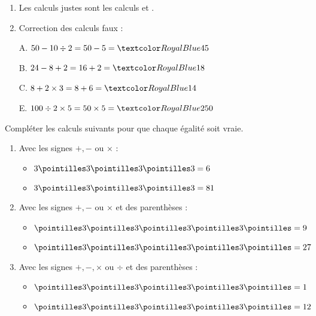 \begin{Maquette}[Fiche,CorrigeFin,Colonnes=2]{}
\begin{multicols}{2}
      \begin{Solution}
         \begin{enumerate}
            \item Les calculs justes sont les calculs  et .
            \item Correction des calculs faux : \par
               A. \; $50-10\div2 =50-5 =\cor{45}$ \par
               B. \; $24-8+2 =16+2 =\cor{18}$ \par
               C. \; $8+2\times3 =8+6 =\cor{14}$ \par
               E. \; $100\div2\times5 =50\times5 = \cor{250}$
         \end{enumerate}
      \end{Solution}
       

      \begin{exercice}[Tout] %
         Compléter les calculs suivants pour que chaque égalité soit vraie.
         \begin{enumerate}
            \item Avec les signes $+, -$ ou $\times$ :
               \begin{itemize}
                  \item $3 \pointilles 3 \pointilles 3 \pointilles 3 = 6$
                  \item $3 \pointilles 3 \pointilles 3 \pointilles 3 = 81$
               \end{itemize}
            \item Avec les signes $+, -$ ou $\times$ et des parenthèses :
               \begin{itemize}
                  \item $\pointilles 3 \pointilles 3 \pointilles 3 \pointilles 3 \pointilles = 9$
                  \item $\pointilles 3 \pointilles 3 \pointilles 3 \pointilles 3 \pointilles = 27$
               \end{itemize}
           \item Avec les signes $+, -,\times$ ou $\div$ et des parenthèses :
            \begin{itemize}
               \item $\pointilles 3 \pointilles 3 \pointilles 3 \pointilles 3 \pointilles = 1$
               \item $\pointilles 3 \pointilles 3 \pointilles 3 \pointilles 3 \pointilles = 12$
            \end{itemize}
         \end{enumerate}
      \end{exercice}
      

\end{multicols}
\end{Maquette}
